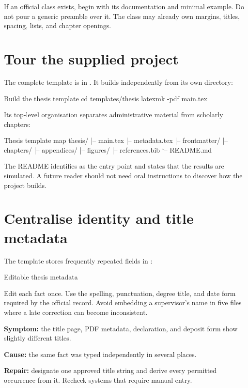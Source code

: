 If an official class exists, begin with its documentation and minimal example.
Do not pour a generic preamble over it. The class may already own margins,
titles, spacing, lists, and chapter openings.

\section{Tour the supplied project}

The complete template is in
. It builds independently from its own directory:

\begin{terminalcode}{Build the thesis template}
cd templates/thesis
latexmk -pdf main.tex
\end{terminalcode}

Its top-level organisation separates administrative material from scholarly
chapters:

\begin{terminalcode}{Thesis template map}
thesis/
|-- main.tex
|-- metadata.tex
|-- frontmatter/
|-- chapters/
|-- appendices/
|-- figures/
|-- references.bib
`-- README.md
\end{terminalcode}

The README identifies  as the entry point and states that the
results are simulated. A future reader should not need oral instructions to
discover how the project builds.

\section{Centralise identity and title metadata}

The template stores frequently repeated fields in :

\begin{latexcode}{Editable thesis metadata}
\newcommand{\ThesisTitle}{[Full approved title]}
\newcommand{\ThesisAuthor}{[Candidate's full name]}
\newcommand{\ThesisDegree}{[Full degree name]}
\newcommand{\ThesisInstitution}{[Institution]}
\newcommand{\ThesisDate}{[Month Year]}
\end{latexcode}

Edit each fact once. Use the spelling, punctuation, degree title, and date form
required by the official record. Avoid embedding a supervisor's name in five
files where a late correction can become inconsistent.

\begin{commonerror}
\textbf{Symptom:} the title page, PDF metadata, declaration, and deposit form
show slightly different titles.

\textbf{Cause:} the same fact was typed independently in several places.

\textbf{Repair:} designate one approved title string and derive every permitted
occurrence from it. Recheck systems that require manual entry.
\end{commonerror}

